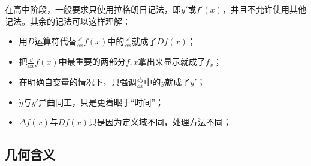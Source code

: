 在高中阶段，一般要求只使用拉格朗日记法，即$y'$或$f'(x)$，并且不允许使用其他记法。其余的记法可以这样理解：
\begin{itemize}
\item 用$D$运算符代替$\displaystyle\frac{\dd}{\dd x}f(x)$中的$\displaystyle\frac{\dd}{\dd x}$就成了$Df(x)$；
\item 把$\displaystyle\frac{\dd}{\dd x}f(x)$中最重要的两部分$f,x$拿出来显示就成了$f_x$；
\item 在明确自变量的情况下，只强调$\displaystyle\frac{\dd y}{\dd x}$中的$y$就成了$y'$；
\item $\dot{y}$与$y'$异曲同工，只是更着眼于“时间”；
\item $\Delta f(x)$与$Df(x)$只是因为定义域不同，处理方法不同；
\end{itemize}

\subsection{几何含义}

